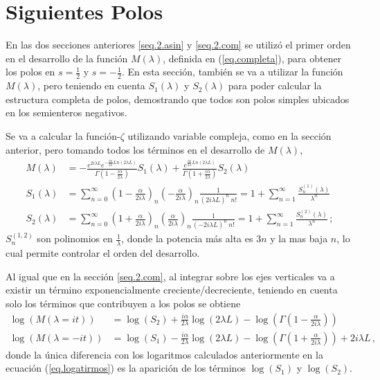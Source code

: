 \section{Siguientes Polos}\label{sec.sig.polos}


En las dos secciones anteriores \ref{seq.2.asin} y \ref{seq.2.com}  se utilizó el primer orden en el desarrollo de la función $ M (\lambda )$, definida en (\ref{eq.completa}), para obtener los polos en $s= \frac{1}{2}$ y $s=- \frac{1}{2}$. En esta sección, también se va a utilizar la función $M ( \lambda )$, pero teniendo en cuenta $S _1 ( \lambda ) $ y $S _2 ( \lambda )$ para poder calcular la estructura completa de polos, demostrando que todos son polos simples ubicados en los semienteros negativos. 


Se va a calcular la función-$\zeta$ utilizando variable compleja, como en la sección anterior, pero tomando todos los términos en el desarrollo de $M ( \lambda )$,
\begin{align}
\label{larga}
M( \lambda ) &= 
-
 \frac{e ^{2 i \lambda L } e ^{ - \frac{i \alpha  }{2 \lambda } Ln \left( 2 \lambda L \right) }  }
      { \Gamma \left( 1 - \frac{i \alpha}{2  \lambda}  \right) } S _1 ( \lambda ) +
 \frac{ e ^{   \frac{i \alpha  } {2 \lambda } Ln \left(2 \lambda L \right) } }
      { \Gamma \left( 1 + \frac{i \alpha}{2  \lambda}  \right)   } S _2 ( \lambda )        
\\[10pt]      
	S _1 ( \lambda ) &= \sum _{n=0} ^{ \infty }
\left(1 - \frac{ \alpha}{2 i \lambda}  \right) _n
\left(- \frac{ \alpha}{2 i \lambda}  \right) _n
\frac{1}{( 2 i \lambda L ) ^n \ n!} = 
	1 + \sum _{n=1} ^{\infty} \frac{S ^{(1)} _n (\lambda)}{\lambda ^n} 
\nonumber
\\[10pt]
	S _2 (\lambda ) &= \sum _{n=0 } ^{\infty}
\left( 1 + \frac{ \alpha}{2 i \lambda }  \right) _n
\left( \frac{ \alpha }{2 i \lambda} \right) _n
\frac{1}{( - 2 i \lambda L ) ^n \ n!} = 
1 + \sum _{n=1} ^{\infty} \frac{S ^{(2)} _n (\lambda)}{\lambda ^n}
\nonumber
\, ;
\end{align}
$S _n ^{(1,2)}$ son polinomios en $\frac{1}{ \lambda}$, donde la potencia más alta es $3 n$ y la mas baja $n$, lo cual permite controlar el orden del desarrollo.


Al igual que en la sección \ref{seq.2.com}, al integrar sobre los ejes verticales va a existir un término exponencialmente creciente/decreciente, teniendo en cuenta solo los términos que contribuyen a los polos se obtiene
\begin{align}
	\log ( M ( \lambda = i t ) ) 
&
	=   \log (S _2) + 
	\frac{i \alpha }{2 \lambda}  \log (2 \lambda L) - 
 	\log \left( \Gamma \left( 1 - \frac{ \alpha}{2 i \lambda} \right) \right) 
\\ 
	\log ( M ( \lambda=-i t ) ) 
&
	=  \log (S _1) -  
	\frac{i \alpha }{2 \lambda}  \log ( 2 \lambda L ) - 
	\log \left( \Gamma \left( 1 + \frac{ \alpha}{2 i \lambda} \right) \right) +
	2 i \lambda L  \nonumber
	\,	,
\end{align}
donde la única diferencia con los logaritmos calculados anteriormente  en la ecuación (\ref{eq.logatirmos}) es la aparición de los términos $\log ( S _1 )$ y $ \log ( S _2) $.

